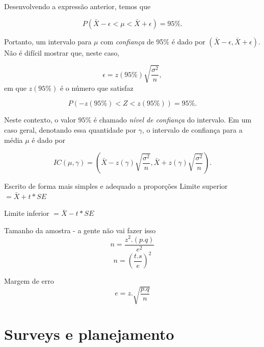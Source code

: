\documentclass[
  9pt,
  ignorenonframetext,
  aspectratio=169]{beamer}
\begin{document}
\begin{frame}{}
\protect\hypertarget{section-6}{}
Desenvolvendo a expressão anterior, temos que

\[
P(\bar{X} - \epsilon < \mu < \bar{X} + \epsilon) = 95\%.
\]

Portanto, um intervalo para \(\mu\) com \emph{confiança} de 95\% é dado
por \((\bar{X} - \epsilon, \bar{X} + \epsilon)\). Não é difícil mostrar
que, neste caso,

\[
\epsilon = z(95\%) \sqrt{\frac{\sigma^2}{n}},
\] em que \(z(95\%)\) é o número que satisfaz

\[
P(-z(95\%) < Z < z(95\%)) = 95\%.
\]
\end{frame}

\begin{frame}{}
\protect\hypertarget{section-7}{}
Neste contexto, o valor \(95\%\) é chamado \emph{nível de confiança} do
intervalo. Em um caso geral, denotando essa quantidade por \(\gamma\), o
intervalo de confiança para a média \(\mu\) é dado por

\[
IC(\mu, \gamma) = \left(\bar{X} - z(\gamma) \sqrt{\frac{\sigma^2}{n}}, \bar{X} + z(\gamma) \sqrt{\frac{\sigma^2}{n}}\right).
\]
\end{frame}

\begin{frame}{Escrito de forma mais simples e adequado a proporções}
\protect\hypertarget{escrito-de-forma-mais-simples-e-adequado-a-proporuxe7uxf5es}{}
Limite superior \(=\bar{X} + t * SE\)

Limite inferior \(=\bar{X} - t * SE\)
\end{frame}

\begin{frame}{Tamanho da amostra - a gente não vai fazer isso}
\protect\hypertarget{tamanho-da-amostra---a-gente-nuxe3o-vai-fazer-isso}{}
\[
n=\frac{z^{2} .(p . q)}{e^{2}}
\] \[
n=\left(\frac{t . s}{e}\right)^{2}
\]
\end{frame}

\begin{frame}{Margem de erro}
\protect\hypertarget{margem-de-erro}{}
\[
e=z . \sqrt{\frac{p . q}{n}}
\]
\end{frame}

\hypertarget{surveys-e-planejamento}{%
\section{Surveys e planejamento}\label{surveys-e-planejamento}}
\end{document}
